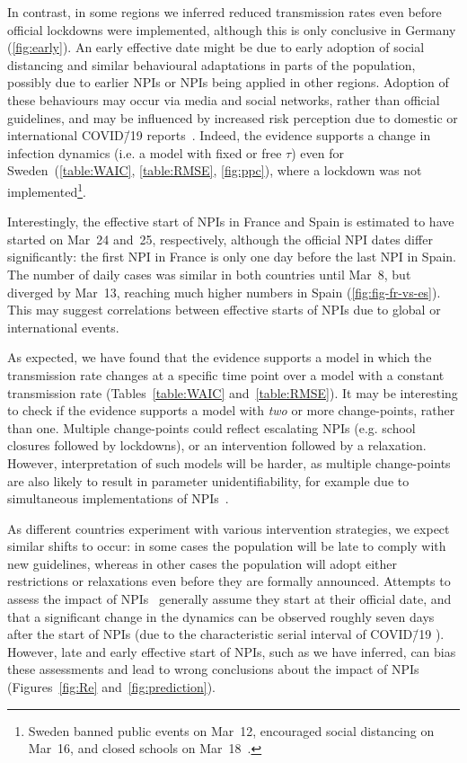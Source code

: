 \documentclass[12pt]{extarticle}
\newcommand{\covid}{COVID\=/19 }
\begin{document}
In contrast, in some regions we inferred reduced transmission rates even before official lockdowns were implemented, although this is only conclusive in Germany (\autoref{fig:early}).
An early effective date might be due to early adoption of social distancing and similar behavioural adaptations in parts of the population, possibly due to earlier NPIs or NPIs being applied in other regions.
Adoption of these behaviours may occur via media and social networks, rather than official guidelines, and may be influenced by increased risk perception due to domestic or international \covid reports~\citep{Arthur2020}.
Indeed, the evidence supports a change in infection dynamics (i.e. a model with fixed or free $\tau$) even for Sweden~(\autoref{table:WAIC}, \autoref{table:RMSE}, \autoref{fig:ppc}), where a lockdown was not implemented\footnote{Sweden banned public events on Mar~12, encouraged social distancing on Mar~16, and closed schools on Mar~18~\citep{Flaxman2020}.}.

Interestingly, the effective start of NPIs in France and Spain is estimated to have started on Mar~24 and~25, respectively,
although the official NPI dates differ significantly: the first NPI in France is only one day before the last NPI in Spain.
The number of daily cases was similar in both countries until Mar~8, but diverged by Mar~13, reaching much higher numbers in Spain (\autoref{fig:fig-fr-vs-es}).
This may suggest correlations between effective starts of NPIs due to global or international events.

As expected, we have found that the evidence supports a model in which the transmission rate changes at a specific time point over a model with a constant transmission rate (Tables~\ref{table:WAIC} and~\ref{table:RMSE}).
It may be interesting to check if the evidence supports a model with \emph{two} or more change-points, rather than one. 
Multiple change-points could reflect escalating NPIs (e.g. school closures followed by lockdowns), or an intervention followed by a relaxation.
However, interpretation of such models will be harder, as multiple change-points are also likely to result in parameter unidentifiability, for example due to simultaneous implementations of NPIs~\citep{Flaxman2020}.

As different countries experiment with various intervention strategies, we expect similar shifts to occur: in some cases the population will be late to comply with new guidelines, whereas in other cases the population will adopt either restrictions or relaxations even before they are formally announced.
Attempts to assess the impact of NPIs~\citep{Banholzer2020,Flaxman2020} generally assume they start at their official date, and that a significant change in the dynamics can be observed roughly seven days after the start of NPIs (due to the characteristic serial interval of \covid\citep{Ali2020}).
However, late and early effective start of NPIs, such as we have inferred, can bias these assessments and lead to wrong conclusions about the impact of NPIs (Figures~\ref{fig:Re} and~\ref{fig:prediction}).
\end{document}
